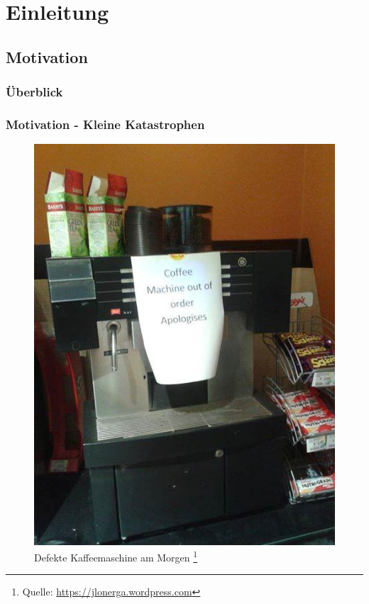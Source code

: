 \section{Einleitung}
\subsection{Motivation}
%
%
\begin{frame}
	\frametitle{Überblick}
	\tableofcontents[currentsubsection]
\end{frame}
%
%
\begin{frame}
	\frametitle{Motivation - Kleine Katastrophen}
	\begin{figure}
		\includegraphics[scale=0.36]{grafiken/broken2}		
		\caption{Defekte Kaffeemaschine am Morgen
			\footnote{\tiny Quelle: \url{https://jlonerga.wordpress.com} }
		}		
	\end{figure}
\end{frame}
%
%
